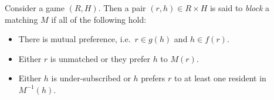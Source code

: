 \begin{definition}\label{def:blocking}
    Consider a game \((R, H)\). Then a pair \((r, h) \in R \times H\) is said to
    \emph{block} a matching \(M\) if all of the following hold:
    \begin{itemize}
        \item There is mutual preference, i.e.\ \(r \in g(h)\) and \(h \in
            f(r)\).
        \item Either \(r\) is unmatched or they prefer \(h\) to \(M(r)\).
        \item Either \(h\) is under-subscribed or \(h\) prefers \(r\) to at
            least one resident in \(M^{-1}(h)\).
    \end{itemize}
\end{definition}

%



